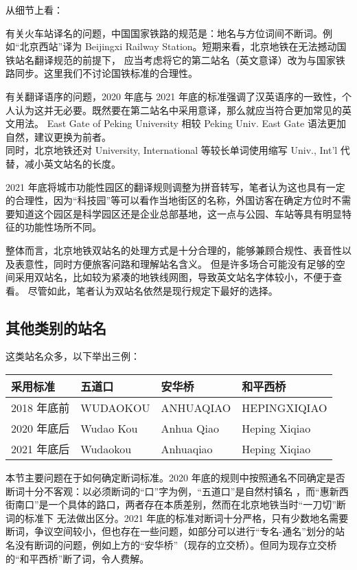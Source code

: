 \documentclass[a4paper,UTF8,12pt]{ctexart}
\begin{document}
        从细节上看：

        有关火车站译名的问题，中国国家铁路的规范是：地名与方位词间不断词。例如“北京西站”译为 Beijingxi Railway Station。短期来看，北京地铁在无法撼动国铁站名翻译规范的前提下，
        应当考虑将它的第二站名（英文意译）改为与国家铁路同步。这里我们不讨论国铁标准的合理性。

        有关翻译语序的问题，2020 年底与 2021 年底的标准强调了汉英语序的一致性，个人认为这并无必要。既然要在第二站名中采用意译，那么就应当符合更加常见的英文用法。
        East Gate of Peking University 相较 Peking Univ. East Gate 语法更加自然，建议更换为前者。\\
        同时，北京地铁还对 University, International 等较长单词使用缩写 Univ., Int'l 代替，减小英文站名的长度。

        2021 年底将城市功能性园区的翻译规则调整为拼音转写，笔者认为这也具有一定的合理性，因为“科技园”等可以看作当地街区的名称，外国访客在确定方位时不需要知道这个园区是科学园区还是企业总部基地，这一点与公园、车站等具有明显特征的功能性场所不同。

        整体而言，北京地铁双站名的处理方式是十分合理的，能够兼顾合规性、表音性以及表意性，同时方便旅客问路和理解站名含义。
        但是许多场合可能没有足够的空间采用双站名，比如较为紧凑的地铁线网图，导致英文站名字体较小，不便于查看。
        尽管如此，笔者认为双站名依然是现行规定下最好的选择。

    \subsection{其他类别的站名}
        这类站名众多，以下举出三例：
        \begin{table}[h]
            \begin{tabular}{|l|l|l|l|}
            \hline
            \textbf{采用标准}     & \textbf{五道口}       & \textbf{安华桥}        & \textbf{和平西桥}          \\ \hline
            2018 年底前 & WUDAOKOU  & ANHUAQIAO  & HEPINGXIQIAO  \\ \hline
            2020 年底后 & Wudao Kou & Anhua Qiao & Heping Xiqiao \\ \hline
            2021 年底后 & Wudaokou  & Anhuaqiao  & Heping Xiqiao \\ \hline
            \end{tabular}
        \end{table}

        本节主要问题在于如何确定断词标准。2020 年底的规则中按照通名不同确定是否断词十分不客观：以必须断词的“口”字为例，“五道口”是自然村镇名 \cite{ref8}，而“惠新西街南口”是一个具体的路口，两者存在本质差别，然而在北京地铁当时“一刀切”断词的标准下
        无法做出区分。2021 年底的标准对断词十分严格，只有少数地名需要断词，争议空间较小，但也存在一些问题，如部分可以进行“专名-通名”划分的站名没有断词的问题，例如上方的“安华桥”（现存的立交桥）。但同为现存立交桥的“和平西桥”断了词，令人费解。
\end{document}
